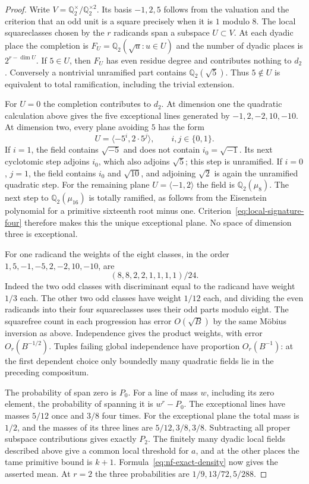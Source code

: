 \documentclass[11pt,letterpaper]{article}
\theoremstyle{definition}
\numberwithin{equation}{section}
\begin{document}
\begin{proof}
Write $V=\mathbb Q_2^\times/\mathbb Q_2^{\times2}$. Its basis
$-1,2,5$ follows from the valuation and the criterion that an odd
unit is a square precisely when it is $1$ modulo $8$. The local
squareclasses chosen by the $r$ radicands span a subspace $U\subset V$.
At each dyadic place the completion is
$F_U=\mathbb Q_2(\sqrt u:u\in U)$ and the number of dyadic places
is $2^{r-\dim U}$. If $5\in U$, then $F_U$ has even residue degree
and contributes nothing to $d_2$. Conversely a nontrivial unramified
part contains $\mathbb Q_2(\sqrt5)$. Thus $5\notin U$ is equivalent
to total ramification, including the trivial extension.

For $U=0$ the completion contributes to $d_2$. At dimension one the
quadratic calculation above gives the five exceptional lines generated
by $-1,2,-2,10,-10$. At dimension two, every plane avoiding $5$
has the form
\[
            U=\langle -5^i,2\cdot5^j\rangle,
                         \qquad i,j\in\{0,1\}.
\]
If $i=1$, the field contains $\sqrt{-5}$ and does not contain $i_0=\sqrt{-1}$.
Its next cyclotomic step adjoins $i_0$, which also adjoins $\sqrt5$;
this step is unramified. If $i=0$, $j=1$, the field contains $i_0$
and $\sqrt{10}$, and adjoining $\sqrt2$ is again the unramified
quadratic step. For the remaining plane
$U=\langle-1,2\rangle$ the field is $\mathbb Q_2(\mu_8)$.
The next step to $\mathbb Q_2(\mu_{16})$ is totally ramified, as
follows from the Eisenstein polynomial for a primitive sixteenth
root minus one. Criterion~\eqref{eq:local-signature-four} therefore
makes this the unique exceptional plane. No space of dimension
three is exceptional.

For one radicand the weights of the eight classes, in the order
$1,5,-1,-5,2,-2,10,-10$, are
\[
                 (8,8,2,2,1,1,1,1)/24 .
\]
Indeed the two odd classes with discriminant equal to the radicand
have weight $1/3$ each. The other two odd classes have weight $1/12$
each, and dividing the even radicands into their four squareclasses
uses their odd parts modulo eight. The squarefree count in each
progression has error $O(\sqrt B)$ by the same M\"obius inversion
as above. Independence gives the product weights, with error
$O_r(B^{-1/2})$. Tuples failing global independence have
proportion $O_r(B^{-1})$: at the first dependent choice only
boundedly many quadratic fields lie in the preceding compositum.

The probability of span zero is $P_0$. For a line of mass $w$,
including its zero element, the probability of spanning it is
$w^r-P_0$. The exceptional lines have masses $5/12$ once and $3/8$
four times. For the exceptional plane the total mass is $1/2$, and
the masses of its three lines are $5/12,3/8,3/8$. Subtracting
all proper subspace contributions gives exactly $P_2$. The
finitely many dyadic local fields described above give a common
local threshold for $a$, and at the other places the tame primitive
bound is $k+1$. Formula~\eqref{eq:nf-exact-density} now gives
the asserted mean. At $r=2$ the three probabilities are
$1/9,13/72,5/288$.
\end{proof}
\end{document}
